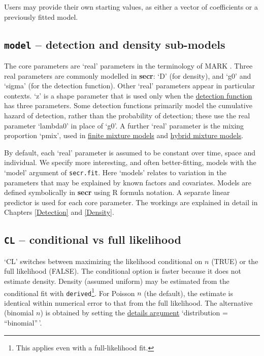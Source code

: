 \documentclass[
]{book}
\begin{document}
Users may provide their own starting values, as either a vector of coefficients or a previously fitted model.

\subsection{\texorpdfstring{\texttt{model} -- detection and density sub-models}{model -- detection and density sub-models}}\label{model-detection-and-density-sub-models}

The core parameters are `real' parameters in the terminology of MARK \citep{cw}. Three real parameters are commonly modelled in \textbf{secr}: `D' (for density), and `g0' and `sigma' (for the detection function). Other `real' parameters appear in particular contexts. `z' is a shape parameter that is used only when the \hyperref[detectfn]{detection function} has three parameters. Some detection functions primarily model the cumulative hazard of detection, rather than the probability of detection; these use the real parameter `lambda0' in place of `g0'. A further `real' parameter is the mixing proportion `pmix', used in \hyperref[finite-mixtures]{finite mixture models} and \hyperref[hybrid-mixtures]{hybrid mixture models}.

By default, each `real' parameter is assumed to be constant over time, space and individual. We specify more interesting, and often better-fitting, models with the `model' argument of \texttt{secr.fit}. Here `models' relates to variation in the parameters that may be explained by known factors and covariates. Models are defined symbolically in \textbf{secr} using R formula notation. A separate linear predictor is used for each core parameter. The workings are explained in detail in Chapters \ref{Detection} and \ref{Density}.

\subsection{\texorpdfstring{\texttt{CL} -- conditional vs full likelihood}{CL -- conditional vs full likelihood}}\label{CL}

`CL' switches between maximizing the likelihood conditional on \(n\) (TRUE) or the full likelihood (FALSE). The conditional option is faster because it does not estimate density. Density (assumed uniform) may be estimated from the conditional fit with \texttt{derived}\footnote{This applies even with a full-likelihood fit.}. For Poisson \(n\) (the default), the estimate is identical within numerical error to that from the full likelihood. The alternative (binomial \(n\)) is obtained by setting the \hyperref[details]{details argument} `distribution = ``binomial''\,'.
\end{document}
